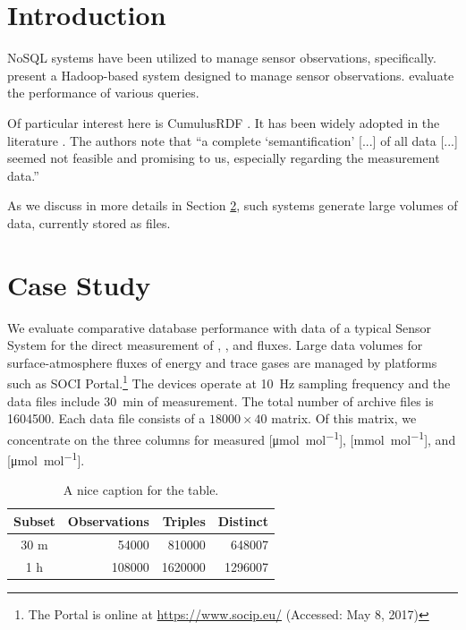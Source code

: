 \documentclass[preprint,12pt,authoryear]{elsarticle}
\begin{document}

\section{Introduction}
\label{s:introduction}
NoSQL systems have been utilized to manage sensor observations, specifically. \citet{wang14hdsw} present a Hadoop-based system designed to manage sensor observations. \citeauthor{wang14hdsw} evaluate the performance of various queries. 

Of particular interest here is CumulusRDF \citep{ladwig11cumulusrdf}. It has been widely adopted in the literature \citep{lefort12qb,phuoc11linked,mueller13restful}. The authors note that ``a complete `semantification' [...] of all data [...] seemed not feasible and promising to us, especially regarding the measurement data.'' 

As we discuss in more details in Section \ref{s:case-study}, such systems generate large volumes of data, currently stored as files.

\section{Case Study}
\label{s:case-study}
We evaluate comparative database performance with data of a typical Sensor System for the direct measurement of , , and  fluxes. Large data volumes for surface-atmosphere fluxes of energy and trace gases are managed by platforms such as SOCI Portal.\footnote{The Portal is online at \url{https://www.socip.eu/} (Accessed: May 8, 2017)} The devices operate at \SI{10}{\hertz} sampling frequency and the data files include \SI{30}{\minute} of measurement. The total number of archive files is \num{1604500}. Each data file consists of a $\num{18000} \times 40$ matrix. Of this matrix, we concentrate on the three columns for measured  [\si{\micro\mol\per\mol}],  [\si{\milli\mol\per\mol}], and  [\si{\micro\mol\per\mol}].

\begin{table}
	\centering
	\caption{A nice caption for the table.}
	\begin{tabular}{|c|r|r|r|}
		\hline
		Subset & Observations & Triples & Distinct \\
		\hline
		30 m & \num{54000} & \num{810000} & \num{648007} \\
		1 h & \num{108000} & \num{1620000} & \num{1296007} \\
		\hline 
	\end{tabular}
	\label{tbl:size-summary}
\end{table}
\end{document}
